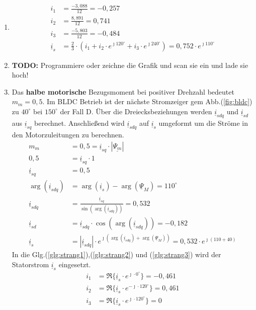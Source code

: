 \begin{solution}
\begin{enumerate}
\item
\begin{align}
i_1 &= \frac{-3,088}{12} = -0,257\\
i_2 &= \frac{8,891}{12} = 0,741\\
i_3 &= \frac{-5,803}{12} = -0,484\\
\underline{i}_s &= \frac{2}{3} \cdot ( i_1 + i_2 \cdot e^{\jmath 120 ^\circ} + i_3 \cdot e^{\jmath 240 ^\circ}) = 0,752 \cdot e^{\jmath 110^\circ}
\end{align}
\item \textbf{TODO:} Programmiere oder zeichne die Grafik und scan sie ein und lade sie hoch!
\item Das \textbf{halbe motorische} Bezugsmoment bei positiver Drehzahl bedeutet $m_m = 0,5$. Im BLDC Betrieb ist der nächste Stromzeiger gem Abb.(\ref{fig:bldc}) zu $40^\circ$ bei $150^\circ$ der Fall D. Über die Dreiecksbeziehungen werden $\underline{i}_{sdq}$ und $\underline{i}_{sd}$ aus $\underline{i}_{sq}$ berechnet. Anschließend wird $\underline{i}_{sdq}$ auf $\underline{i}_{s}$ umgeformt um die Ströme in den Motorzuleitungen zu berechnen.
\begin{align}
m_m &= 0,5 = \underline{i}_{sq} \cdot |\underline{\Psi_m}|\\
0,5&= \underline{i}_{sq} \cdot 1\\
\underline{i}_{sq} &= 0,5\\
\arg(\underline{i}_{sdq}) &= \arg(\underline{i}_{s}) -\arg(\underline{\Psi}_{M})=110^\circ\\
\underline{i}_{sdq} &= \frac{\underline{i}_{sq}}{\sin(\arg(\underline{i}_{sdq}))}= 0,532\\
\underline{i}_{sd} &= \underline{i}_{sdq} \cdot \cos(\arg(\underline{i}_{sdq})) = -0,182\\
\underline{i}_{s} &= |\underline{i}_{sdq}| \cdot e^{\jmath (\arg(\underline{i}_{sdq}) + \arg(\underline{\Psi}_{M}))}= 0,532 \cdot e^{\jmath ( 110 + 40)}
\end{align}
In die Glg.(\ref{glg:strang1}),(\ref{glg:strang2}) und (\ref{glg:strang3}) wird der Statorstrom $\underline{i}_s$ eingesetzt.
\begin{align}
i_1 & = \Re \{ \underline{i}_s \cdot e^{\jmath \cdot 0 ^\circ} \} = -0,461\\
i_2 & = \Re \{ \underline{i}_s \cdot e^{-\jmath \cdot 120 ^\circ} \} = 0,461 \\
i_3 & = \Re \{ \underline{i}_s \cdot e^{\jmath \cdot 120 ^\circ} \}=  0

\end{align}
\end{enumerate}
\end{solution}
